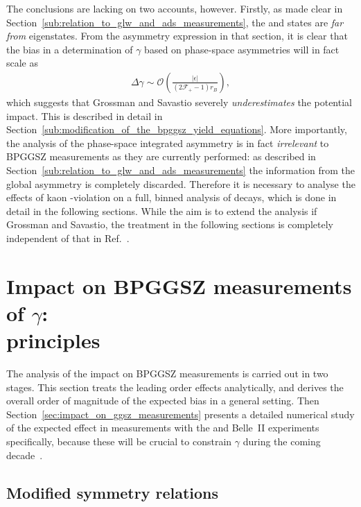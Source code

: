 The conclusions are lacking on two accounts, however. Firstly, as made clear in Section~\ref{sub:relation_to_glw_and_ads_measurements}, the \Kspipi and \KsKK states are \emph{far from} \CP eigenstates. From the asymmetry expression in that section, it is clear that the bias in a determination of $\gamma$ based on phase-space asymmetries will in fact scale as 
\begin{align}
  \Delta \gamma \sim \mathcal O \left(
  \frac{|\epsilon|}
  {(2\mathcal F_+ -1)r_B}
  \right),
\end{align} which suggests that Grossman and Savastio severely \emph{underestimates} the potential impact. This is described in detail in Section~\ref{sub:modification_of_the_bpggsz_yield_equations}. More importantly, the analysis of the phase-space integrated asymmetry is in fact \emph{irrelevant} to BPGGSZ measurements as they are currently performed: as described in Section~\ref{sub:relation_to_glw_and_ads_measurements} the information from the global asymmetry is completely discarded. Therefore it is necessary to analyse the effects of kaon \CP-violation on a full, binned analysis of \DtoKshh decays, which is done in detail in the following sections. While the aim is to extend the analysis if Grossman and Savastio, the treatment in the following sections is completely independent of that in Ref.~\cite{grossmanEffectsBarMixing2014}.

\section{\texorpdfstring{Impact on BPGGSZ measurements of $\gamma$: \\principles}{Impact on BPGGSZ measurements of gamma: principles}}%
\label{sec:impact_on_}

The analysis of the impact on BPGGSZ measurements is carried out in two stages. This section treats the leading order effects analytically, and derives the overall order of magnitude of the expected bias in a general setting. Then Section~\ref{sec:impact_on_ggsz_measurements} presents a detailed numerical study of the expected effect in measurements with the \lhcb and Belle~II experiments specifically, because these will be crucial to constrain $\gamma$ during the coming decade~\cite{kouBelleIIPhysics2019,lhcbcollaborationPhysicsCaseLHCb2019}. 

\subsection{Modified symmetry relations} %
\label{sub:modified_symmetry_relations}


